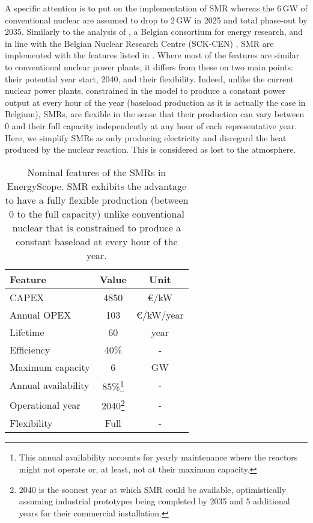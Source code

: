 A specific attention is to put on the implementation of \gls{SMR} whereas the 6\,GW of conventional nuclear are assumed to drop to 2\,GW in 2025 and total phase-out by 2035. Similarly to the analysis of \citet{PATHS2050}, a Belgian consortium for energy research, and in line with the Belgian Nuclear Research Centre (SCK-CEN) \cite{SCK-CEN_SMR}, \gls{SMR} are implemented with the features listed in . Where most of the features are similar to conventional nuclear power plants, it differs from these on two main points: their potential year start, 2040, and their flexibility. Indeed, unlike the current nuclear power plants, constrained in the model to produce a constant power output at every hour of the year (\ie baseload production as it is actually the case in Belgium), SMRs, are flexible in the sense that their production can vary between 0 and their full capacity independently at any hour of each representative year. Here, we simplify SMRs as only producing electricity and disregard the heat produced by the nuclear reaction. This is considered as lost to the atmosphere.

\begin{table}[htbp!]
\caption{Nominal features of the SMRs in EnergyScope. \gls{SMR} exhibits the advantage to have a fully flexible production (\ie between 0 to the full capacity) unlike conventional nuclear that is constrained to produce a constant baseload at every hour of the year.}
\label{tab:SMR_features}
\begin{minipage}{\linewidth}
\centering
\begin{tabular}{l c c}
\toprule
\textbf{Feature} & \textbf{Value} & \textbf{Unit}\\
\midrule
CAPEX & 4850 & €/kW \\
Annual OPEX & 103 & €/kW/year \\
Lifetime & 60 & year \\
Efficiency & 40\% & -\\
Maximum capacity & 6 & GW \\
Annual availability & 85\%\footnote{\label{foot:avail_SMR}This annual availability accounts for yearly maintenance where the reactors might not operate or, at least, not at their maximum capacity. } & -\\
Operational year & 2040\footnote{\label{foot:op_year_SMR}2040 is the soonest year at which \gls{SMR} could be available, optimistically assuming industrial prototypes being completed by 2035 and 5 additional years for their commercial installation.} & - \\
Flexibility & Full & - \\
\bottomrule							

\end{tabular}
\end{minipage}
\end{table}



